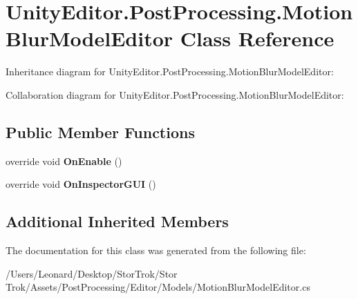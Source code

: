 \hypertarget{class_unity_editor_1_1_post_processing_1_1_motion_blur_model_editor}{}\section{Unity\+Editor.\+Post\+Processing.\+Motion\+Blur\+Model\+Editor Class Reference}
\label{class_unity_editor_1_1_post_processing_1_1_motion_blur_model_editor}


Inheritance diagram for Unity\+Editor.\+Post\+Processing.\+Motion\+Blur\+Model\+Editor\+:


Collaboration diagram for Unity\+Editor.\+Post\+Processing.\+Motion\+Blur\+Model\+Editor\+:
\subsection*{Public Member Functions}
\begin{DoxyCompactItemize}
\item 
\mbox{\label{class_unity_editor_1_1_post_processing_1_1_motion_blur_model_editor_a3cc4895e7a3e5aa942b94c6f4ff1126a}} 
override void {\bfseries On\+Enable} ()
\item 
\mbox{\label{class_unity_editor_1_1_post_processing_1_1_motion_blur_model_editor_ab747616bf4f9492da7e18ea96f9f0360}} 
override void {\bfseries On\+Inspector\+G\+UI} ()
\end{DoxyCompactItemize}
\subsection*{Additional Inherited Members}


The documentation for this class was generated from the following file\+:\begin{DoxyCompactItemize}
\item 
/\+Users/\+Leonard/\+Desktop/\+Stor\+Trok/\+Stor Trok/\+Assets/\+Post\+Processing/\+Editor/\+Models/Motion\+Blur\+Model\+Editor.\+cs\end{DoxyCompactItemize}
